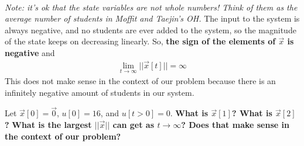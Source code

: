 \begin{enumerate}
{\begin{align*}
        \end{align*}
        \textit{Note: it's ok that the state variables are not whole numbers! Think of them as the average number of students in Moffit and Taejin's OH.}
        \newline
        The input to the system is always negative, and no students are ever added to the system, so the magnitude of the state keeps on decreasing linearly. So, \textbf{the sign of the elements of $\vec{x}$ is negative} and
        \begin{align*}
            \lim_{t \to \infty} ||\vec{x}[t]|| = \infty
        \end{align*}
        This does not make sense in the context of our problem because there is an infinitely negative amount of students in our system.
    }

    \vspace{12cm}
    \qitem Let $\vec{x}[0] = \vec{0}$, $u[0] = 16$, and $u[t>0] = 0$. \textbf{What is $\vec{x}[1]$? What is $\vec{x}[2]$?} \textbf{What is the largest $||\vec{x}||$ can get as $t\rightarrow\infty$? Does that make sense in the context of our problem?}

\end{enumerate}
